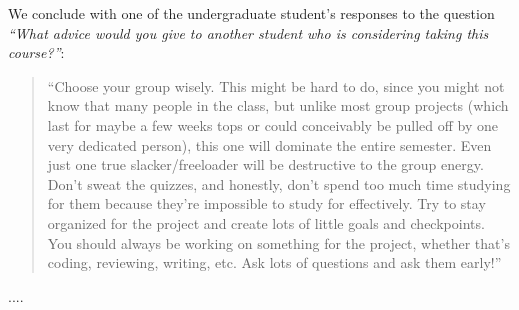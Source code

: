 We conclude with one of the undergraduate student's responses to the question
\emph{``What advice would you give to another student who is considering taking this course?''}:
\begin{quotation}
``Choose your group wisely. This might be hard to do, since you might not know
that many people in the class, but unlike most group projects (which last for
maybe a few weeks tops or could conceivably be pulled off by one very dedicated
person), this one will dominate the entire semester. Even just one true
slacker/freeloader will be destructive to the group energy. Don't sweat the
quizzes, and honestly, don't spend too much time studying for them because
they're impossible to study for effectively. Try to stay organized for the
project and create lots of little goals and checkpoints. You should always be
working on something for the project, whether that's coding, reviewing,
writing, etc. Ask lots of questions and ask them early!''
\end{quotation}
....
